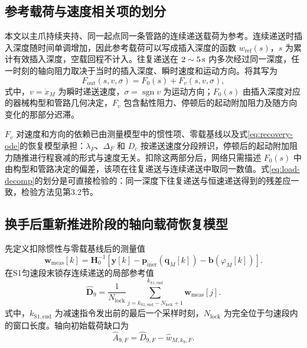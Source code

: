 \documentclass{JQRnew}
\providecommand{\RevisionColor}{\color{black}}
\newcommand{\revbegin}{\begingroup\RevisionColor}
\newcommand{\revend}{\par\endgroup}
\begin{document}
\revbegin
\subsection{参考载荷与速度相关项的划分}
\revend

\revbegin
本文以主爪持续夹持、同一起点同一条管路的连续递送载荷为参考。连续递送时插入深度随时间单调增加，因此参考载荷可以写成插入深度的函数 $w_{\mathrm{ref}}(s)$，$s$ 为累计有效插入深度，空载回程不计入。往复递送在 $2\sim5\,{\rm s}$ 内多次经过同一深度，任一时刻的轴向阻力取决于当时的插入深度、瞬时速度和运动方向。将其写为
\begin{equation}
\label{eq:load-decomp}
F_{\mathrm{out}}(s,v,\sigma)=F_0(s)+F_v(s,v,\sigma),
\end{equation}
式中，$v=\dot x_M$ 为瞬时递送速度，$\sigma=\operatorname{sgn}v$ 为运动方向；$F_0(s)$ 由插入深度对应的器械构型和管路几何决定，$F_v$ 包含黏性阻力、停顿后的起动附加阻力及随方向变化的那部分迟滞。
\revend

\revbegin
$F_v$ 对速度和方向的依赖已由测量模型中的惯性项、零载基线以及式\eqref{eq:recovery-ode}的恢复模型承担：$\lambda_F$、$\Delta_F$ 和 $D_c$ 按递送速度分段辨识，停顿后的起动附加阻力随推进行程衰减的形式与速度无关。扣除这两部分后，网络只需描述 $F_0(s)$ 中由构型和管路决定的偏差，该项在往复递送与连续递送中取同一数值。式\eqref{eq:load-decomp}的划分是可直接检验的：同一深度下往复递送与恒速递送得到的残差应一致，检验方法见第3.2节。
\revend

\revbegin
\subsection{换手后重新推进阶段的轴向载荷恢复模型}
\revend

\revbegin
先定义扣除惯性与零载基线后的测量值
\begin{equation}
\label{eq:corrected-measurement}
\bm w_{\mathrm{meas}}[k]=\bm H_0^{-1}\!\left[
\bm y[k]-\bm p_{\mathrm{iner}}(\bm q_M[k])-\bm b(\varphi_M[k])\right].
\end{equation}
在S1匀速段末锁存连续递送的局部参考值
\begin{equation}
\label{eq:lock}
\widehat{\bm D}_9=\frac{1}{N_{\mathrm{lock}}}
\sum_{j=k_{\mathrm{S1,end}}-N_{\mathrm{lock}}+1}^{k_{\mathrm{S1,end}}}
\bm w_{\mathrm{meas}}[j].
\end{equation}
式中，$k_{\mathrm{S1,end}}$ 为减速指令发出前的最后一个采样时刻，$N_{\mathrm{lock}}$ 为完全位于匀速段内的窗口长度。轴向初始载荷缺口为
\begin{equation}
\label{eq:deficit}
\widehat A_{9,F}=\widehat D_{9,F}-\widehat w_{M,k_9,F}.
\end{equation}
\revend
\end{document}
